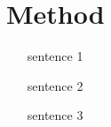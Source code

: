 \section{Method}

\begin{itemize}
    \item [sentence 1]
    \item [sentence 2]
    \item [sentence 3]    
\end{itemize}